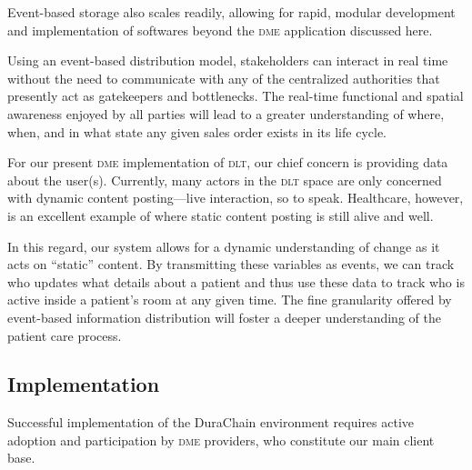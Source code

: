   Event-based storage also scales readily, allowing for rapid, modular development and implementation of softwares beyond the \textsc{dme} application discussed here.%

  Using an event-based distribution model, stakeholders can interact in real time without the need to communicate with any of the centralized authorities that presently act as gatekeepers and bottlenecks. The real-time functional and spatial awareness enjoyed by all parties will lead to a greater understanding of where, when, and in what state any given sales order exists in its life cycle.%

  For our present \textsc{dme} implementation of \textsc{dlt}, our chief concern is providing data about the user(s). Currently, many actors in the \textsc{dlt} space are only concerned with dynamic content posting---live interaction, so to speak. Healthcare, however, is an excellent example of where static content posting is still alive and well.%

  In this regard, our system allows for a dynamic understanding of change as it acts on ``static'' content. By transmitting these variables as events, we can track who updates what details about a patient and thus use these data to track who is active inside a patient's room at any given time. The fine granularity offered by event-based information distribution will foster a deeper understanding of the patient care process.%



\subsection{Implementation}
 Successful implementation of the DuraChain environment requires active adoption and participation by \textsc{dme} providers, who constitute our main client base.%

